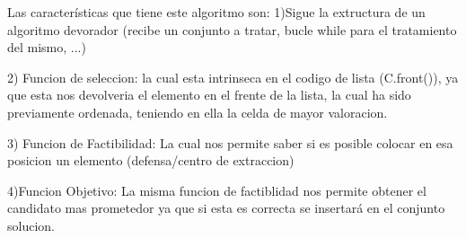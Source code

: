 Las características que tiene este algoritmo son:
1)Sigue la extructura de un algoritmo devorador (recibe un conjunto a tratar, bucle while para el
tratamiento del mismo, ...)

2) Funcion de seleccion: la cual esta intrinseca en el codigo de lista (C.front()), ya que esta
nos devolveria el elemento en el frente de la lista, la cual ha sido previamente ordenada, teniendo
en ella la celda de mayor valoracion.

3) Funcion de Factibilidad: La cual nos permite saber si es posible colocar en esa posicion un elemento
(defensa/centro de extraccion)

4)Funcion Objetivo: La misma funcion de factiblidad nos permite obtener el candidato
mas prometedor ya que si esta es correcta se insertará en el conjunto solucion.
